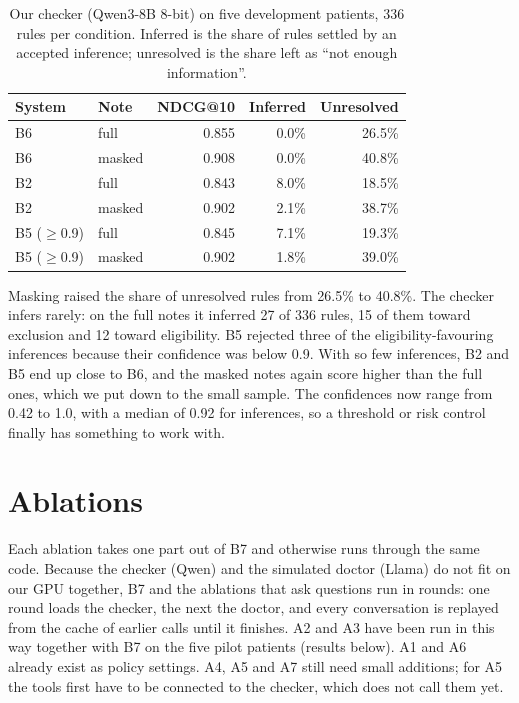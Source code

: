 \documentclass[10pt,a4paper,twocolumn]{article}
\begin{document}
\begin{table}[H]
\centering\footnotesize
\begin{tabular}{@{}llrrr@{}}
\toprule
\textbf{System} & \textbf{Note} & \textbf{NDCG@10} & \textbf{Inferred} & \textbf{Unresolved}\\
\midrule
B6 & full & 0.855 & 0.0\% & 26.5\%\\
B6 & masked & 0.908 & 0.0\% & 40.8\%\\
B2 & full & 0.843 & 8.0\% & 18.5\%\\
B2 & masked & 0.902 & 2.1\% & 38.7\%\\
B5 (\(\ge\)0.9) & full & 0.845 & 7.1\% & 19.3\%\\
B5 (\(\ge\)0.9) & masked & 0.902 & 1.8\% & 39.0\%\\
\bottomrule
\end{tabular}
\caption{Our checker (Qwen3-8B 8-bit) on five development patients, 336 rules per condition. Inferred is the share of rules settled by an accepted inference; unresolved is the share left as ``not enough information''.}
\label{tab:systems}
\end{table}

Masking raised the share of unresolved rules from 26.5\% to 40.8\%. The checker infers rarely: on the full notes it inferred 27 of 336 rules, 15 of them toward exclusion and 12 toward eligibility. B5 rejected three of the eligibility-favouring inferences because their confidence was below 0.9. With so few inferences, B2 and B5 end up close to B6, and the masked notes again score higher than the full ones, which we put down to the small sample. The confidences now range from 0.42 to 1.0, with a median of 0.92 for inferences, so a threshold or risk control finally has something to work with.

\section{Ablations}
Each ablation takes one part out of B7 and otherwise runs through the same code. Because the checker (Qwen) and the simulated doctor (Llama) do not fit on our GPU together, B7 and the ablations that ask questions run in rounds: one round loads the checker, the next the doctor, and every conversation is replayed from the cache of earlier calls until it finishes. A2 and A3 have been run in this way together with B7 on the five pilot patients (results below). A1 and A6 already exist as policy settings. A4, A5 and A7 still need small additions; for A5 the tools first have to be connected to the checker, which does not call them yet.
\end{document}
